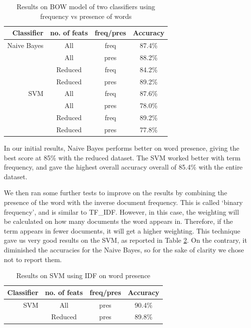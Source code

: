 \documentclass{article}
\begin{document}
\begin{table}[ht!]
  \centering
  \begin{tabular}{ r | c | c | c }
    Classifier & no. of feats & freq/pres & Accuracy \\
		\hline \hline
		Naive Bayes & All & freq & 87.4\% \\
		& All & pres & 88.2\% \\
		& Reduced & freq & 84.2\%\\
		& Reduced & pres & 89.2\%\\
		\hline
		SVM & All & freq & 87.6\%\\
		& All & pres & 78.0\% \\
		& Reduced & freq & 89.2\% \\
		& Reduced & pres & 77.8\% \\
		\hline
  \end{tabular}
  \caption{Results on BOW model of two classifiers using frequency vs presence of words}
  \label{tab:bowresults}
\end{table}

In our initial results, Naive Bayes performs better on word presence, giving the best score at 85\% with the reduced dataset. The SVM worked better with term frequency, and gave the highest overall accuracy overall of 85.4\% with the entire dataset. 

We then ran some further tests to improve on the results by combining the presence of the word with the inverse document frequency. This is called `binary frequency', and is similar to TF\_IDF. However, in this case, the weighting will be calculated on how many documents the word appears in. Therefore, if the term appears in fewer documents, it will get a higher weighting. This technique gave us very good results on the SVM, as reported in Table \ref{tab:bowresults2}. On the contrary, it diminished the accuracies for the Naive Bayes, so for the sake of clarity we chose not to report them.

\begin{table}[ht!]
  \centering
  \begin{tabular}{ r | c | c | c }
    Classifier & no. of feats & freq/pres & Accuracy \\
	\hline \hline
		SVM & All & pres & 90.4\% \\
		& Reduced & pres & 89.8\% \\
		\hline
  \end{tabular}
  \caption{Results on SVM using IDF on word presence}
  \label{tab:bowresults2}
\end{table}
\end{document}
